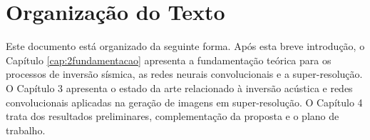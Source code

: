 \section{Organização do Texto}

Este documento está organizado da seguinte forma. Após esta breve introdução, o
Capítulo \ref{cap:2fundamentacao} apresenta a fundamentação teórica para os
processos de inversão sísmica, as redes neurais 
convolucionais e a super-resolução. O Capítulo 3%
apresenta o estado da arte relacionado à inversão acústica  e
redes convolucionais aplicadas na geração de imagens em super-resolução. 
O Capítulo 4 %
trata dos resultados preliminares, complementação da proposta e o plano de trabalho.
